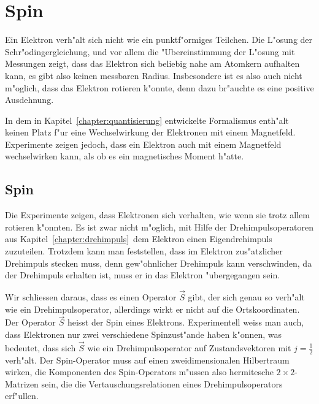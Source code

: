 \chapter{Spin}
\rhead{}
Ein Elektron verh"alt sich nicht wie ein punktf"ormiges Teilchen.
Die L"osung der Schr"odingergleichung, und vor allem die "Ubereinstimmung
der L"osung mit Messungen zeigt, dass das Elektron sich beliebig nahe 
am Atomkern aufhalten kann, es gibt also keinen messbaren Radius.
Insbesondere ist es also auch nicht m"oglich, dass das Elektron
rotieren k"onnte, denn dazu br"auchte es eine positive Ausdehnung.

In dem in Kapitel~\ref{chapter:quantisierung} entwickelte Formalismus
enth"alt keinen Platz f"ur eine Wechselwirkung der Elektronen
mit einem Magnetfeld.
Experimente zeigen jedoch, dass ein Elektron auch mit einem Magnetfeld
wechselwirken kann, als ob es ein magnetisches Moment h"atte. 

\section{Spin}
Die Experimente zeigen, dass Elektronen sich verhalten, wie wenn sie
trotz allem rotieren k"onnten.
Es ist zwar nicht m"oglich, mit Hilfe der Drehimpulsoperatoren
aus Kapitel~\ref{chapter:drehimpuls} dem Elektron einen Eigendrehimpuls
zuzuteilen.
Trotzdem kann man feststellen, dass im Elektron zus"atzlicher
Drehimpuls stecken muss, denn gew"ohnlicher Drehimpuls kann verschwinden,
da der Drehimpuls erhalten ist, muss er in das Elektron "ubergegangen
sein.

Wir schliessen daraus, dass es einen Operator $\vec S$ gibt, der sich
genau so verh"alt wie ein Drehimpulsoperator, allerdings wirkt er nicht
auf die Ortskoordinaten.
Der Operator $\vec S$ heisst der Spin eines Elektrons.
Experimentell weiss man auch, dass Elektronen nur zwei verschiedene
Spinzust"ande haben k"onnen, was bedeutet, dass sich $\vec S$ wie ein
Drehimpulsoperator auf Zustandsvektoren mit $j=\frac12$ verh"alt.
Der Spin-Operator muss auf einen zweidimensionalen Hilbertraum
wirken, die Komponenten des Spin-Operators m"ussen also hermitesche
$2\times 2$-Matrizen sein, die die Vertauschungsrelationen eines
Drehimpulsoperators erf"ullen.

